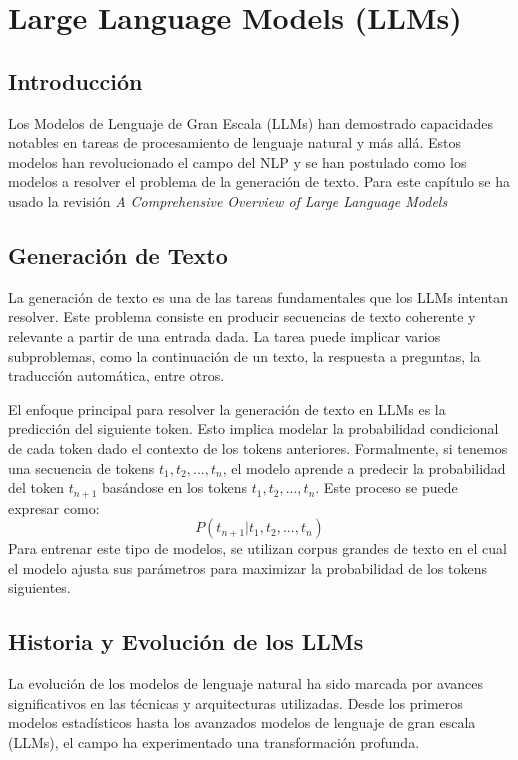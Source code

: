 \cleardoublepage

\chapter{Large Language Models (LLMs)}
\label{Large Language Models (LLMs)}

\section{Introducción}
Los Modelos de Lenguaje de Gran Escala (LLMs) han demostrado capacidades notables en tareas de procesamiento de lenguaje natural y más allá. Estos modelos han revolucionado el campo del NLP y se han postulado como los modelos a resolver el problema de la generación de texto. 
Para este capítulo se ha usado la revisión \textit{A Comprehensive Overview of Large Language Models} \citep{naveed2023comprehensive}

\section{Generación de Texto}
La generación de texto es una de las tareas fundamentales que los LLMs intentan resolver. Este problema consiste en producir secuencias de texto coherente y relevante a partir de una entrada dada. La tarea puede implicar varios subproblemas, como la continuación de un texto, la respuesta a preguntas, la traducción automática, entre otros.

El enfoque principal para resolver la generación de texto en LLMs es la predicción del siguiente token. Esto implica modelar la probabilidad condicional de cada token dado el contexto de los tokens anteriores. Formalmente, si tenemos una secuencia de tokens \( t_1, t_2, ..., t_n \), el modelo aprende a predecir la probabilidad del token \( t_{n+1} \) basándose en los tokens \( t_1, t_2, ..., t_n \). Este proceso se puede expresar como:
\[ P(t_{n+1} | t_1, t_2, ..., t_n) \]
Para entrenar este tipo de modelos, se utilizan corpus grandes de texto en el cual el modelo ajusta sus parámetros para maximizar la probabilidad de los tokens siguientes.

\section{Historia y Evolución de los LLMs}
La evolución de los modelos de lenguaje natural ha sido marcada por avances significativos en las técnicas y arquitecturas utilizadas. Desde los primeros modelos estadísticos hasta los avanzados modelos de lenguaje de gran escala (LLMs), el campo ha experimentado una transformación profunda.

